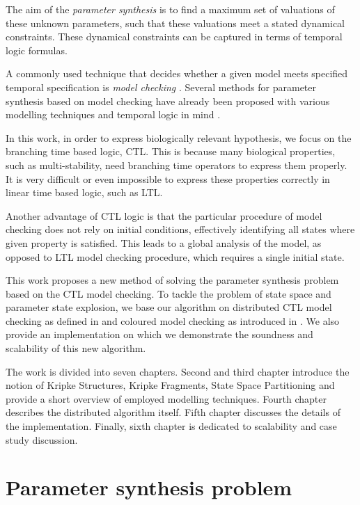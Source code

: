 \documentclass[12pt,oneside]{fithesis2}
\begin{document}
		The aim of the \emph{parameter synthesis} is to find a maximum set of valuations of these unknown parameters, such that these valuations meet a stated dynamical constraints. These dynamical constraints can be captured in terms of temporal logic formulas. 
				
		A commonly used technique that decides whether a given model meets specified temporal specification is \emph{model checking} \cite{clarke}. Several methods for parameter synthesis based on model checking have already been proposed with various modelling techniques and temporal logic in mind \cite{ieee,batt,gilbert,donze,jha}.
		
		In this work, in order to express biologically relevant hypothesis, we focus on the branching time based logic, CTL. This is because many biological properties, such as multi-stability, need branching time operators to express them properly. It is very difficult or even impossible to express these properties correctly in linear time based logic, such as LTL. 
		
		Another advantage of CTL logic is that the particular procedure of model checking does not rely on initial conditions, effectively identifying all states where given property is satisfied. This leads to a global analysis of the model, as opposed to LTL model checking procedure, which requires a single initial state.
				
		This work proposes a new method of solving the parameter synthesis problem based on the CTL model checking. To tackle the problem of state space and parameter state explosion, we base our algorithm on distributed CTL model checking as defined in \cite{assumptions} and coloured model checking as introduced in \cite{ieee}. We also provide an implementation on which we demonstrate the soundness and scalability of this new algorithm. 		
		
		The work is divided into seven chapters. Second and third chapter introduce the notion of Kripke Structures, Kripke Fragments, State Space Partitioning and provide a short overview of employed modelling techniques. Fourth chapter describes the distributed algorithm itself. Fifth chapter discusses the details of the implementation. Finally, sixth chapter is dedicated to scalability and case study discussion.
				
	\chapter{Parameter synthesis problem}
		
\end{document}
